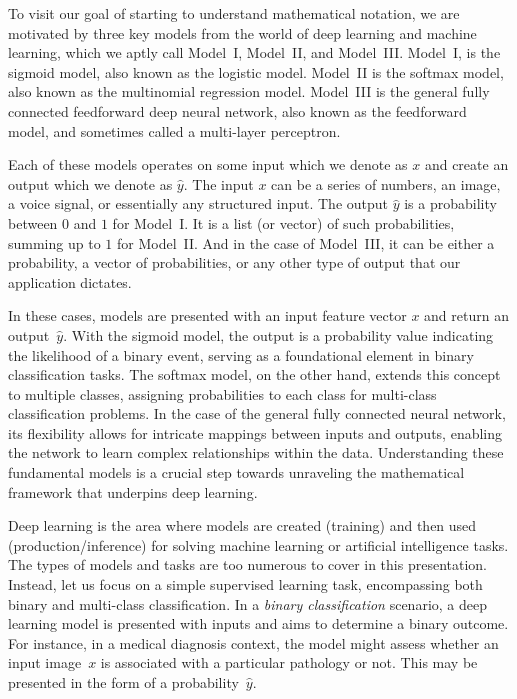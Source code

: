 To visit our goal of starting to understand mathematical notation, we are motivated by three key models from the world of deep learning and machine learning, which we aptly call Model~I, Model~II, and Model~III. Model~I, is the sigmoid model, also known as the logistic model. Model~II is the softmax model, also known as the multinomial regression model. Model~III is the general fully connected feedforward deep neural network, also known as the feedforward model, and sometimes called a multi-layer perceptron. 

Each of these models operates on some input which we denote as $x$ and create an output which we denote as $\hat{y}$. The input $x$ can be a series of numbers, an image, a voice signal, or essentially any structured input. The output $\hat{y}$ is a probability between $0$ and $1$ for Model~I. It is a list (or vector) of such probabilities, summing up to $1$ for Model~II. And in the case of Model~III, it can be either a probability, a vector of probabilities, or any other type of output that our application dictates. 

In these cases, models are presented with an input feature vector $x$ and return an output~$\hat{y}$. With the sigmoid model, the output is a probability value indicating the likelihood of a binary event, serving as a foundational element in binary classification tasks. The softmax model, on the other hand, extends this concept to multiple classes, assigning probabilities to each class for multi-class classification problems. In the case of the general fully connected neural network, its flexibility allows for intricate mappings between inputs and outputs, enabling the network to learn complex relationships within the data. Understanding these fundamental models is a crucial step towards unraveling the mathematical framework that underpins deep learning.

Deep learning is the area where models are created (training) and then used (production/inference) for solving machine learning or artificial intelligence tasks. The types of models and tasks are too numerous to cover in this presentation. Instead, let us focus on a simple supervised learning task, encompassing both binary and multi-class classification. In a {\em binary classification} scenario, a deep learning model is presented with inputs and aims to determine a binary outcome. For instance, in a medical diagnosis context, the model might assess whether an  input image~$x$ is associated with a particular pathology or not. This may be presented in the form of a probability~$\hat{y}$.

